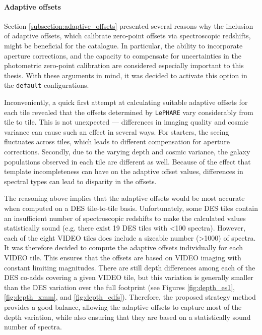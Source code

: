 \paragraph{Adaptive offsets}Section \ref{subsection:adaptive_offsets} presented several reasons why the inclusion of adaptive offsets, which calibrate zero-point offsets via spectroscopic redshifts, might be beneficial for the \DESVIDEO catalogue. In particular, the ability to incorporate aperture corrections, and the capacity to compensate for uncertainties in the photometric zero-point calibration are considered especially important to this thesis. With these arguments in mind, it was decided to activate this option in the \texttt{default} configurations. \par

Inconveniently, a quick first attempt at calculating suitable adaptive offsets for each \DESVIDEO tile revealed that the offsets determined by \texttt{LePHARE} vary considerably from tile to tile. This is not unexpected --- differences in imaging quality and cosmic variance can cause such an effect in several ways. For starters, the seeing fluctuates across tiles, which leads to different compensation for aperture corrections. Secondly, due to the varying depth and cosmic variance, the galaxy populations observed in each tile are different as well. Because of the effect that template incompleteness can have on the adaptive offset values, differences in spectral types can lead to disparity in the offsets. \par

The reasoning above implies that the adaptive offsets would be most accurate when computed on a DES tile-to-tile basis. Unfortunately, some DES tiles contain an insufficient number of spectroscopic redshifts to make the calculated values statistically sound (e.g. there exist 19 DES tiles with <100 spectra). However, each of the eight VIDEO tiles does include a sizeable number (>1000) of spectra. It was therefore decided to compute the adaptive offsets individually for each VIDEO tile. This ensures that the offsets are based on VIDEO imaging with constant limiting magnitudes. There are still depth differences among each of the DES co-adds covering a given VIDEO tile, but this variation is generally smaller than the DES variation over the full footprint (see Figures \ref{fig:depth_es1}, \ref{fig:depth_xmm}, and \ref{fig:depth_cdfs}). Therefore, the proposed strategy method provides a good balance, allowing the adaptive offsets to capture most of the depth variation, while also ensuring that they are based on a statistically sound number of spectra. \par

